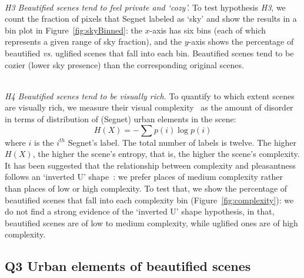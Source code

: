 \mbox{ } \\
\noindent
\emph{H3 Beautified scenes tend to feel private and `cozy'.}
To  test hypothesis \emph{H3}, we count the fraction of pixels that Segnet labeled  as `sky' and show the results in a bin plot in Figure~\ref{fig:skyBinned}:  the $x$-axis has six bins (each of which represents a given range of sky fraction), and the $y$-axis shows the percentage of beautified \emph{vs.} uglified scenes that fall into each bin.  Beautified scenes tend to be cozier (lower sky presence) than the corresponding original scenes.


\mbox{ } \\
\noindent
\emph{H4 Beautified scenes tend to be visually rich.}
To quantify to which extent scenes are visually rich, we measure their visual complexity~\cite{ewing2013measuring} as  the amount of disorder in terms of distribution of (Segnet) urban elements in the scene: 
\begin{equation}
H(X) = -\sum p(i)\log p(i)
\label{eq:entropy} 
\end{equation}
where $i$ is the $i^{th}$ Segnet's label. The total number of labels is twelve. The higher $H(X)$, the  higher the scene's entropy, that is, the higher the scene's complexity. It has been suggested that the relationship between complexity and  pleasantness follows an `inverted U' shape~\cite{ulrich1983aesthetic}: we prefer places of medium complexity rather than places of low or high complexity. To test that, we show the percentage of beautified scenes that fall into each complexity bin  (Figure~\ref{fig:complexity}):  we do not find a strong evidence of the `inverted U' shape hypothesis, in that, beautified scenes are of low to medium complexity, while uglified ones are of high complexity.



\subsection{Q3 Urban elements of beautified scenes}

